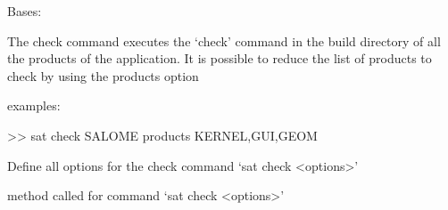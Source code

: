 \documentclass[a4paper,10pt,english]{sphinxmanual}
\begin{document}
\begin{fulllineitems}
\label{\detokenize{apidoc_commands/commands:commands.check.Command}}
Bases: 

The check command executes the ‘check’ command in the build directory of 
all the products of the application.
It is possible to reduce the list of products to check
by using the \textendash{}products option

\begin{DUlineblock}{0em}
\item[] examples:
\item[] \textgreater{}\textgreater{} sat check SALOME \textendash{}products KERNEL,GUI,GEOM
\end{DUlineblock}

\begin{fulllineitems}
\label{\detokenize{apidoc_commands/commands:commands.check.Command.getParser}}
Define all options for the check command ‘sat check \textless{}options\textgreater{}’

\end{fulllineitems}


\begin{fulllineitems}
\label{\detokenize{apidoc_commands/commands:commands.check.Command.name}}
\end{fulllineitems}


\begin{fulllineitems}
\label{\detokenize{apidoc_commands/commands:commands.check.Command.run}}
method called for command ‘sat check \textless{}options\textgreater{}’

\end{fulllineitems}


\end{fulllineitems}

\end{document}
